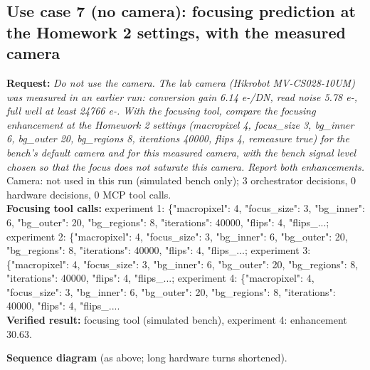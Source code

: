\subsection*{Use case 7 (no camera): focusing prediction at the Homework 2 settings, with the measured camera}
\textbf{Request:} \emph{Do not use the camera. The lab camera (Hikrobot MV-CS028-10UM) was measured in an earlier run: conversion gain 6.14 e-/DN, read noise 5.78 e-, full well at least 24766 e-. With the focusing tool, compare the focusing enhancement at the Homework 2 settings (macropixel 4, focus\_size 3, bg\_inner 6, bg\_outer 20, bg\_regions 8, iterations 40000, flips 4, remeasure true) for the bench's default camera and for this measured camera, with the bench signal level chosen so that the focus does not saturate this camera. Report both enhancements.}\\
Camera: not used in this run (simulated bench only); 3 orchestrator decisions, 0 hardware decisions, 0 MCP tool calls.
\\{\small\textbf{Focusing tool calls:} experiment 1: \{"macropixel": 4, "focus\_size": 3, "bg\_inner": 6, "bg\_outer": 20, "bg\_regions": 8, "iterations": 40000, "flips": 4, "flips\_...; experiment 2: \{"macropixel": 4, "focus\_size": 3, "bg\_inner": 6, "bg\_outer": 20, "bg\_regions": 8, "iterations": 40000, "flips": 4, "flips\_...; experiment 3: \{"macropixel": 4, "focus\_size": 3, "bg\_inner": 6, "bg\_outer": 20, "bg\_regions": 8, "iterations": 40000, "flips": 4, "flips\_...; experiment 4: \{"macropixel": 4, "focus\_size": 3, "bg\_inner": 6, "bg\_outer": 20, "bg\_regions": 8, "iterations": 40000, "flips": 4, "flips\_....}
\\\textbf{Verified result:} focusing tool (simulated bench), experiment 4: enhancement 30.63.
\par\smallskip\textbf{Sequence diagram} (as above; long hardware turns shortened).
